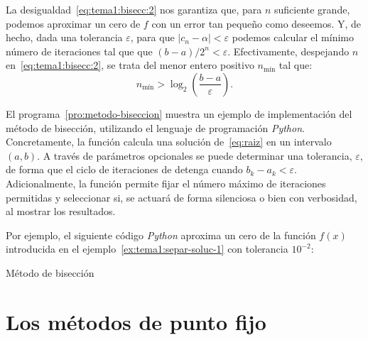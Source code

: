 \begin{remark}
  \label{rk:tema1:bisecc:iteraciones}
  La desigualdad~\eqref{eq:tema1:bisecc:2} nos garantiza que, para $n$
  suficiente grande, podemos aproximar un cero de $f$ con un error tan
  pequeño como deseemos. Y, de hecho, dada una tolerancia $\varepsilon$,
  para que $|c_n-\alpha|<\varepsilon$ podemos calcular el mínimo número
  de iteraciones tal que que $(b-a)/2^n < \varepsilon$. Efectivamente,
  despejando $n$ en~\eqref{eq:tema1:bisecc:2}, se trata del menor
  entero positivo $n_{\text{mín}}$ tal que:
  \begin{equation*}
    n_{\text{mín}}>\log_2\left(\frac{b-a}{\varepsilon}\right).
  \end{equation*}
\end{remark}


\begin{test}
  El programa~\ref{pro:metodo-biseccion} muestra un ejemplo de
  implementación del método de bisección, utilizando el lenguaje de
  programación \textit{Python}. Concretamente, la función
   calcula una solución
  de~\eqref{eq:raiz} en un intervalo $(a,b)$. A través de parámetros
  opcionales se puede determinar una tolerancia, $\varepsilon$, de
  forma que el ciclo de iteraciones de detenga cuando
  $b_k-a_k<\varepsilon$. Adicionalmente, la función permite fijar el
  número máximo de iteraciones permitidas y seleccionar si, se actuará
  de forma silenciosa o bien con verbosidad, al mostrar los resultados.

  Por ejemplo, el siguiente código \textit{Python} aproxima un cero de
  la función $f(x)$ introducida en el
  ejemplo~\ref{ex:tema1:separ-soluc-1} 
  con tolerancia $10^{-2}$:
  \begin{pythonoutput}
  \end{pythonoutput}
\end{test}


\begin{program}
  \label{pro:metodo-biseccion}
  \caption{Método de bisección}
\end{program}


\section{Los métodos de punto fijo}
\label{sec:metodos-de-punto-fijo}

